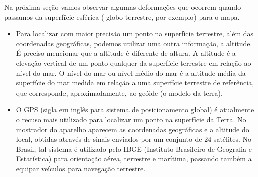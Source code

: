  


Na próxima seção vamos observar algumas deformações que ocorrem quando passamos da superfície esférica ( globo terrestre, por exemplo) para o mapa.

\begin{knowledge}
\begin{itemize}
\item Para localizar com maior precisão um ponto na superfície terrestre, além das coordenadas geográficas, podemos utilizar uma outra informação, a altitude. É preciso mencionar que a altitude é diferente de altura. A altitude é a elevação vertical de um ponto qualquer da superfície terrestre em relação ao nível do mar. O nível do mar ou nível médio do mar é a altitude média da superfície do mar medida em relação a uma superfície terrestre de referência, que corresponde, aproximadamente, ao geóide (o modelo da terra).

\item O GPS (sigla em inglês para sistema de posicionamento global) é atualmente o recuso mais utilizado para localizar um ponto na superfície da Terra. No mostrador do aparelho aparecem as coordenadas geográficas e a altitude do local, obtidas através de sinais enviados por um conjunto de 24 satélites.  No Brasil, tal sistema é utilizado pelo IBGE (Instituto Brasileiro de Geografia e Estatística) para orientação aérea, terrestre e marítima, passando também a equipar veículos para navegação terrestre.
\end{itemize}
\end{knowledge}



\cleardoublepage

